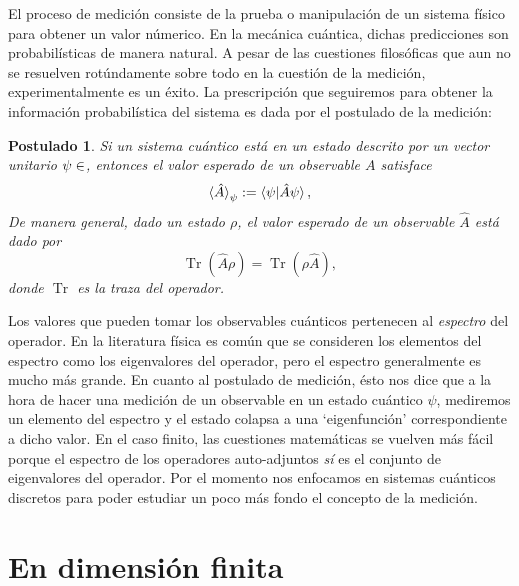 \documentclass[a4paper]{report}
\let\H\relax
\DeclareMathOperator{\H}{\mathcal H}
\DeclareMathOperator{\Tr}{Tr}
\newtheorem{axiom}{Postulado}
\begin{document}
  El proceso de medición consiste de la prueba o
  manipulación de un sistema físico para obtener un valor
  númerico. En la mecánica cuántica, dichas predicciones son
  probabilísticas de manera natural. A pesar de las
  cuestiones filosóficas que aun no se resuelven
  rotúndamente sobre todo en la cuestión de la medición,
  experimentalmente es un éxito. La prescripción que
  seguiremos para obtener la información probabilística del
  sistema es dada por el postulado de la medición:
  \begin{axiom}
    \label{ax:3}
    Si un sistema cuántico está en un estado descrito por un
    vector unitario $\psi \in \H$, entonces el valor
    esperado de un observable $A$ satisface
    \[
      \braket{\hat A}_\psi
      := \braket{\psi|\hat A \psi},
    \] 
    De manera general, dado un estado $\rho$, el valor
    esperado de un observable $\hat{A}$ está dado por
    \[
      \Tr\left(\hat{A}\rho\right)
      = \Tr\left( \rho\hat{A} \right),
    \]
    donde $\Tr$ es la traza del operador.
  \end{axiom}
  Los valores que pueden tomar los observables cuánticos
  pertenecen al \textit{espectro} del operador. En la
  literatura física es común que se consideren los elementos
  del espectro como los eigenvalores del operador, pero el
  espectro generalmente es mucho más grande. En cuanto al
  postulado de medición, ésto nos dice que a la hora de
  hacer una medición de un observable en un estado cuántico
  $\psi$, mediremos un elemento del espectro y el estado
  colapsa a una `eigenfunción' correspondiente a dicho
  valor. En el caso finito, las cuestiones matemáticas se
  vuelven más fácil porque el espectro de los operadores
  auto-adjuntos \textit{sí} es el conjunto de eigenvalores
  del operador. Por el momento nos enfocamos en sistemas
  cuánticos discretos para poder estudiar un poco más fondo
  el concepto de la medición.

  \section{En dimensión finita}
\end{document}
